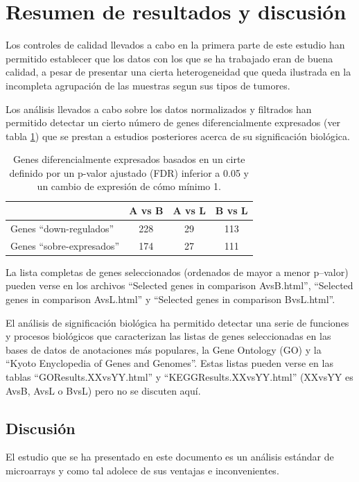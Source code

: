 \documentclass[a4paper]{article}\usepackage[]{graphicx}\usepackage[]{color}
\begin{document}
\section{Resumen de resultados y discusión}

Los controles de calidad llevados a cabo en la primera parte de  este estudio han permitido establecer que los datos con los que se ha trabajado eran de buena calidad, a pesar de presentar una cierta heterogeneidad que queda ilustrada en la incompleta agrupación de las muestras segun sus tipos de tumores.

Los análisis llevados a cabo sobre los datos normalizados y filtrados han permitido detectar un cierto número de genes diferencialmente expresados (ver tabla \ref{resum1}) que se prestan a estudios posteriores acerca de su significación biológica.

\begin{table}[htbp]
\caption{Genes diferencialmente expresados basados en un cirte definido por un p-valor ajustado (FDR) inferior a 0.05 y un cambio de expresión de cómo mínimo 1.}
\begin{tabular}{|l|c|c|c|}
\hline
 & A vs B & A vs L & B vs L \\ \hline
Genes “down-regulados” & 228 & 29 & 113 \\ \hline
Genes “sobre-expresados” & 174 & 27 & 111 \\ \hline
\end{tabular}
\label{resum1}
\end{table}

La lista completas de genes seleccionados (ordenados de mayor a menor p--valor) pueden verse en los archivos ``Selected genes in comparison AvsB.html'', ``Selected genes in comparison AvsL.html'' y ``Selected genes in comparison BvsL.html''.

El análisis de significación biológica ha permitido detectar una serie de funciones y procesos biológicos que caracterizan las listas de genes seleccionadas en las bases de datos de anotaciones más populares, la Gene Ontology (GO) y la ``Kyoto Enyclopedia of Genes and Genomes''. Estas listas pueden verse en las tablas ``GOResults.XXvsYY.html'' y ``KEGGResults.XXvsYY.html'' (XXvsYY es AvsB, AvsL o BvsL) pero no se discuten aquí.

\subsection{Discusión}

El estudio que se ha presentado en este documento es un análisis estándar de microarrays y como tal adolece de sus ventajas e inconvenientes.
\end{document}
